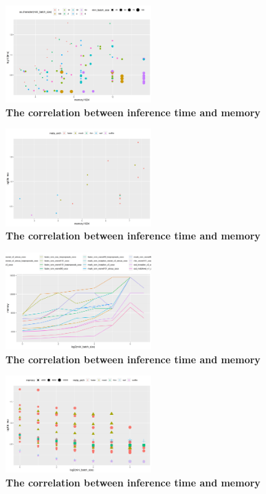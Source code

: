 \documentclass[conference]{IEEEtran}
\begin{document}
\begin{figure}[htpb]
	  \centering
	  \includegraphics[width=0.5\textwidth]{MemoryVSRunning-Batch}
	  \caption{\textbf{The correlation between inference time and memory}}
	  \label{fig:memory-running-batch}
\end{figure}


\begin{figure}[htpb]
	  \centering
	  \includegraphics[width=0.5\textwidth]{MemoryVSRunning-Meta}
	  \caption{\textbf{The correlation between inference time and memory}}
	  \label{fig:memory-running-meta}
\end{figure}

\begin{figure}[htpb]
	  \centering
	  \includegraphics[width=0.5\textwidth]{MemoryVSBatch}
	  \caption{\textbf{The correlation between inference time and memory}}
	  \label{fig:memory-batch}
\end{figure}

\begin{figure}[htpb]
	  \centering
	  \includegraphics[width=0.5\textwidth]{RunningTimeVSBatch}
	  \caption{\textbf{The correlation between inference time and memory}}
	  \label{fig:running-batch}
\end{figure}
\end{document}
